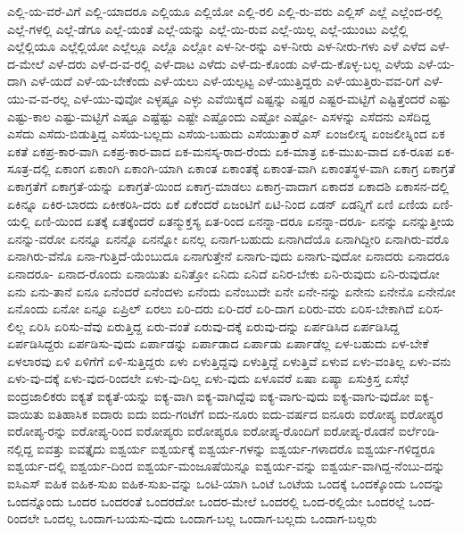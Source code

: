 {ಎಲ್ಲಿ-ಯ-ವರೆ-ವಿಗೆ
ಎಲ್ಲಿ-ಯಾದರೂ
ಎಲ್ಲಿಯೂ
ಎಲ್ಲಿಯೋ
ಎಲ್ಲಿ-ರಲಿ
ಎಲ್ಲಿ-ರು-ವರು
ಎಲ್ಲಿಸ್
ಎಲ್ಲೆ
ಎಲ್ಲೆಂದ-ರಲ್ಲಿ
ಎಲ್ಲೆ-ಗಳಲ್ಲಿ
ಎಲ್ಲೆ-ಡೆಗೂ
ಎಲ್ಲೆ-ಯಂತೆ
ಎಲ್ಲೆ-ಯನ್ನು
ಎಲ್ಲೆ-ಯಿ-ರುವ
ಎಲ್ಲೆ-ಯಿಲ್ಲ
ಎಲ್ಲೆ-ಯುಂಟು
ಎಲ್ಲೆಲ್ಲಿ
ಎಲ್ಲೆಲ್ಲಿಯೂ
ಎಲ್ಲೆಲ್ಲಿಯೋ
ಎಲ್ಲೆಲ್ಲೂ
ಎಲ್ಲೊ
ಎಲ್ಲೋ
ಎಳ-ನೀ-ರನ್ನು
ಎಳ-ನೀರು
ಎಳ-ನೀರು-ಗಳು
ಎಳೆ
ಎಳೆದ
ಎಳೆ-ದ-ಮೇಲೆ
ಎಳೆ-ದರು
ಎಳೆ-ದ-ವ-ರಲ್ಲಿ
ಎಳೆ-ದಾಟ
ಎಳೆದು
ಎಳೆ-ದು-ಕೊಂಡು
ಎಳೆ-ದು-ಕೊಳ್ಳ-ಬಲ್ಲ
ಎಳೆಯ
ಎಳೆ-ಯ-ದಾಗಿ
ಎಳೆ-ಯದೆ
ಎಳೆ-ಯ-ಬೇಕೆಂದು
ಎಳೆ-ಯಲು
ಎಳೆ-ಯಲ್ಪಟ್ಟ
ಎಳೆ-ಯುತ್ತಿದ್ದರು
ಎಳೆ-ಯುತ್ತಿರು-ವವ-ರಿಗೆ
ಎಳೆ-ಯು-ವ-ವ-ರಲ್ಲ
ಎಳೆ-ಯು-ವುವೋ
ಎಳ್ಳಷ್ಟೂ
ಎಳ್ಳು
ಎವೆಯಿಕ್ಕದೆ
ಎಷ್ಟನ್ನು
ಎಷ್ಟರ
ಎಷ್ಟರ-ಮಟ್ಟಿಗೆ
ಎಷ್ಟಿತ್ತೆಂದರೆ
ಎಷ್ಟು
ಎಷ್ಟು-ಕಾಲ
ಎಷ್ಟು-ಮಟ್ಟಿಗೆ
ಎಷ್ಟೂ
ಎಷ್ಟೆಷ್ಟು
ಎಷ್ಟೇ
ಎಷ್ಟೊಂದು
ಎಷ್ಟೋ
ಎಷ್ಟೋ-
ಎಸಳನ್ನು
ಎಸೆದನು
ಎಸೆದಿದ್ದ
ಎಸೆದು
ಎಸೆದು-ಬಿಡುತ್ತಿದ್ದ
ಎಸೆಯ-ಬಲ್ಲದು
ಎಸೆಯ-ಬಹುದು
ಎಸೆಯುತ್ತಾರೆ
ಎಸ್
ಏಂಜಲೀಸ್ನ
ಏಂಜಲೀಸ್ನಿಂದ
ಏಕ
ಏಕತೆ
ಏಕಪ್ರ-ಕಾರ-ವಾಗಿ
ಏಕಪ್ರ-ಕಾರ-ವಾದ
ಏಕ-ಮನಸ್ಕ-ರಾದ-ರೆಂದು
ಏಕ-ಮಾತ್ರ
ಏಕ-ಮುಖ-ವಾದ
ಏಕ-ರೂಪ
ಏಕ-ಸೂತ್ರ-ದಲ್ಲಿ
ಏಕಾಂಗ
ಏಕಾಂಗಿ
ಏಕಾಂಗಿ-ಯಾಗಿ
ಏಕಾಂತ
ಏಕಾಂತಕ್ಕೆ
ಏಕಾಂತ-ವಾಗಿ
ಏಕಾಂತಸ್ಥಳ-ವಾಗಿ
ಏಕಾಗ್ರ
ಏಕಾಗ್ರತೆ
ಏಕಾಗ್ರತೆಗೆ
ಏಕಾಗ್ರತೆ-ಯನ್ನು
ಏಕಾಗ್ರತೆ-ಯಿಂದ
ಏಕಾಗ್ರ-ಮಾಡಲು
ಏಕಾಗ್ರ-ವಾದಾಗ
ಏಕಾದಶ
ಏಕಾದಶಿ
ಏಕಾಸನ-ದಲ್ಲಿ
ಏಕಿನ್ನೂ
ಏಕಿರ-ಬಾರದು
ಏಕೀಕರಿಸಿ-ದರು
ಏಕೆ
ಏಕೆಂದರೆ
ಏಜಂಟಿಗೆ
ಏಟಿ-ನಿಂದ
ಏಡನ್
ಏಡನ್ನಿಗೆ
ಏಣಿ
ಏಣಿಯ
ಏಣಿ-ಯಲ್ಲಿ
ಏಣಿ-ಯಿಂದ
ಏತಕ್ಕೆ
ಏತಕ್ಕೆಂದರೆ
ಏತನ್ಮುಕ್ತಸ್ಯ
ಏತ-ರಿಂದ
ಏನನ್ನಾ-ದರೂ
ಏನನ್ನಾ-ದರೂ-
ಏನನ್ನು
ಏನನ್ನುತ್ತೀಯ
ಏನನ್ನು-ವರೋ
ಏನನ್ನೂ
ಏನನ್ನೊ
ಏನನ್ನೋ
ಏನಲ್ಲ
ಏನಾಗ-ಬಹುದು
ಏನಾಗಿದೆಯೊ
ಏನಾಗಿದ್ದೀರಿ
ಏನಾಗಿರು-ವರೊ
ಏನಾಗಿರು-ವೆನೊ
ಏನಾ-ಗುತ್ತಿದೆ-ಯೆಂಬುದೂ
ಏನಾಗುತ್ತೇನೆ
ಏನಾಗು-ವುದು
ಏನಾಗು-ವುದೋ
ಏನಾದರು
ಏನಾದರೂ
ಏನಾದರೂ-
ಏನಾದ-ರೊಂದು
ಏನಾಯಿತು
ಏನಿತ್ತೋ
ಏನಿದು
ಏನಿದೆ
ಏನಿರ-ಬೇಕು
ಏನಿ-ರುವುದು
ಏನಿ-ರುವುದೋ
ಏನು
ಏನು-ತಾನೆ
ಏನೂ
ಏನೆಂದರೆ
ಏನೆಂದಳು
ಏನೆಂದು
ಏನೆಂಬುದೇ
ಏನೇ
ಏನೇ-ನನ್ನು
ಏನೇನು
ಏನೇನೊ
ಏನೇನೋ
ಏನೊಂದು
ಏನೋ
ಏನ್ನೂ
ಏಪ್ರಿಲ್
ಏರಲು
ಏರಿ-ದರು
ಏರಿ-ದರೆ
ಏರಿ-ದಾಗ
ಏರಿರು-ವರು
ಏರಿಸ-ಬೇಕಾಗಿದೆ
ಏರಿಸ-ಲಿಲ್ಲ
ಏರಿಸಿ
ಏರಿಸು-ವೆವು
ಏರುತ್ತಿದ್ದ
ಏರು-ವಂತೆ
ಏರುವು-ದಕ್ಕೆ
ಏರುವು-ದನ್ನು
ಏರ್ಪಡಿಸಿದ
ಏರ್ಪಡಿಸಿದ್ದ
ಏರ್ಪಡಿಸಿದ್ದರು
ಏರ್ಪಡಿಸು-ವುದು
ಏರ್ಪಾಡನ್ನು
ಏರ್ಪಾಡಾದ
ಏರ್ಪಾಡು
ಏರ್ಪಾಡೆಲ್ಲ
ಏಳ-ಬಹುದು
ಏಳ-ಬೇಕೆ
ಏಳಲಾರವು
ಏಳಿ
ಏಳಿಗೆಗೆ
ಏಳಿ-ಸುತ್ತಿದ್ದರು
ಏಳು
ಏಳುತ್ತಿದ್ದವು
ಏಳುತ್ತಿದ್ದೆ
ಏಳುತ್ತಿವೆ
ಏಳುವ
ಏಳು-ವಂತಿಲ್ಲ
ಏಳು-ವನು
ಏಳು-ವು-ದಕ್ಕೆ
ಏಳು-ವುದ-ರಿಂದಲೇ
ಏಳು-ವು-ದಿಲ್ಲ
ಏಳು-ವುದು
ಏಳೂವರೆ
ಏಷಾ
ಏಷ್ಯಾ
ಏಸುಕ್ರಿಸ್ತ
ಏಸೆಛೆ
ಐಂದ್ರಜಾಲಿಕರು
ಐಕ್ಯತೆ
ಐಕ್ಯತೆ-ಯನ್ನು
ಐಕ್ಯ-ವಾಗಿ
ಐಕ್ಯ-ವಾಗಿದ್ದೆವು
ಐಕ್ಯ-ವಾಗು-ವುದು
ಐಕ್ಯ-ವಾಗು-ವುದೋ
ಐಕ್ಯ-ವಾಯಿತು
ಐತಿಹಾಸಿಕ
ಐದಾರು
ಐದು
ಐದು-ಗಂಟೆಗೆ
ಐದು-ನೂರು
ಐದು-ವರ್ಷದ
ಐನೂರು
ಐರೋಪ್ಯ
ಐರೋಪ್ಯರ
ಐರೋಪ್ಯ-ರನ್ನು
ಐರೋಪ್ಯ-ರಿಂದ
ಐರೋಪ್ಯರು
ಐರೋಪ್ಯರೂ
ಐರೋಪ್ಯ-ರೊಂದಿಗೆ
ಐರೋಪ್ಯ-ರೊಡನೆ
ಐರ್ಲೆಂಡಿ-ನಲ್ಲಿದ್ದ
ಐವತ್ತು
ಐವತ್ತೈದು
ಐಶ್ವರ್ಯ
ಐಶ್ವರ್ಯಕ್ಕೆ
ಐಶ್ವರ್ಯ-ಗಳನ್ನು
ಐಶ್ವರ್ಯ-ಗಳಾದರೊ
ಐಶ್ವರ್ಯ-ಗಳಿದ್ದರೂ
ಐಶ್ವರ್ಯ-ದಲ್ಲಿ
ಐಶ್ವರ್ಯ-ದಿಂದ
ಐಶ್ವರ್ಯ-ಮಂಜೂಷೆಯಿನ್ನೂ
ಐಶ್ವರ್ಯ-ವನ್ನು
ಐಶ್ವರ್ಯ-ವಾಗಿದ್ದ-ನೆಂಬು-ದನ್ನು
ಐಸಿಎಸ್
ಐಹಿಕ
ಐಹಿಕ-ಸುಖ
ಐಹಿಕ-ಸುಖ-ವನ್ನು
ಒಂಟಿ-ಯಾಗಿ
ಒಂಟೆ
ಒಂಟೆಯ
ಒಂದಕ್ಕೆ
ಒಂದಕ್ಕೊಂದು
ಒಂದನ್ನು
ಒಂದನ್ನೊಂದು
ಒಂದರ
ಒಂದರಂತೆ
ಒಂದರದೋ
ಒಂದರ-ಮೇಲೆ
ಒಂದರಲ್ಲಿ
ಒಂದ-ರಲ್ಲಿಯೇ
ಒಂದರಲ್ಲೆ
ಒಂದ-ರಿಂದಲೇ
ಒಂದಲ್ಲ
ಒಂದಾಗ-ಬಯಸು-ವುದು
ಒಂದಾಗ-ಬಲ್ಲ
ಒಂದಾಗ-ಬಲ್ಲದು
ಒಂದಾಗ-ಬಲ್ಲರು
}
